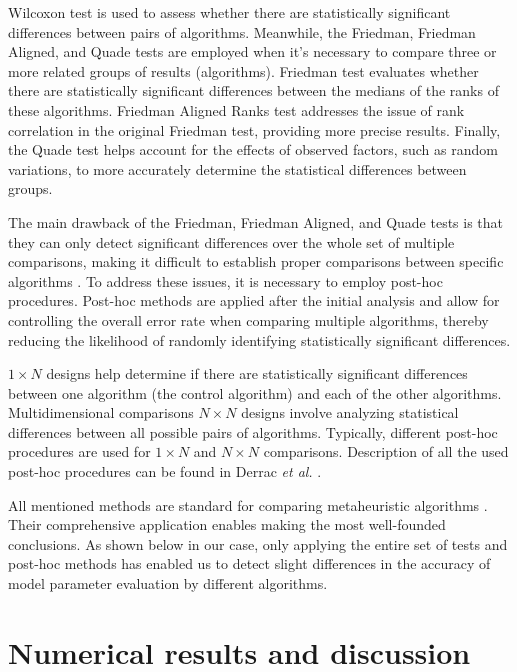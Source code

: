 \documentclass[a4paper,fleqn]{cas-sc}
\begin{document}
Wilcoxon test is used to assess whether there are statistically significant differences between pairs of algorithms.
Meanwhile, the Friedman, Friedman Aligned, and Quade tests are employed when it's necessary to compare three or more related groups of results (algorithms).
Friedman test evaluates whether there are statistically significant differences between the medians of the ranks of these algorithms.
Friedman Aligned Ranks test addresses the issue of rank correlation in the original Friedman test, providing more precise results.
Finally, the Quade test helps account for the effects of observed factors, such as random variations,
to more accurately determine the statistical differences between groups.

The main drawback of the Friedman, Friedman Aligned, and Quade tests is that
they can only detect significant differences over the whole set of multiple comparisons,
making it difficult to establish proper comparisons between specific algorithms \cite{Derrac2011}.
To address these issues, it is necessary to employ post-hoc procedures.
Post-hoc methods are applied after the initial analysis and allow for controlling the overall error rate
when comparing multiple algorithms, thereby reducing the likelihood of randomly identifying statistically significant differences.

$1\times N$ designs help determine if there are statistically significant differences between one algorithm
(the control algorithm) and each of the other algorithms.
Multidimensional comparisons $N\times N$ designs involve analyzing statistical differences between all possible pairs of algorithms.
Typically, different post-hoc procedures are used for $1\times N$ and $N\times N$ comparisons.
Description of all the used post-hoc procedures can be found in Derrac \emph{et al.} \cite{Derrac2011}.

All mentioned methods are standard for comparing metaheuristic algorithms \cite{Derrac2011}.
Their comprehensive application enables making the most well-founded conclusions.
As shown below in our case, only applying the entire set of tests and post-hoc methods
has enabled us to detect slight differences in the accuracy of model parameter evaluation by different algorithms.



\section{Numerical results and discussion}\label{Result}
\end{document}
